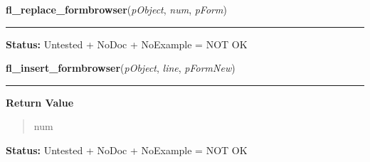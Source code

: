     \vspace{0.5ex}

\hspace{.8\funcindent}\begin{boxedminipage}{\funcwidth}

    \raggedright \textbf{fl\_replace\_formbrowser}(\textit{pObject}, \textit{num}, \textit{pForm})

    \vspace{-1.5ex}

    \rule{\textwidth}{0.5\fboxrule}
\setlength{\parskip}{2ex}
\setlength{\parskip}{1ex}
\textbf{Status:} Untested + NoDoc + NoExample = NOT OK



    \end{boxedminipage}

    \label{xformslib:library:fl_insert_formbrowser}

    \vspace{0.5ex}

\hspace{.8\funcindent}\begin{boxedminipage}{\funcwidth}

    \raggedright \textbf{fl\_insert\_formbrowser}(\textit{pObject}, \textit{line}, \textit{pFormNew})

    \vspace{-1.5ex}

    \rule{\textwidth}{0.5\fboxrule}
\setlength{\parskip}{2ex}
\setlength{\parskip}{1ex}
      \textbf{Return Value}
    \vspace{-1ex}

      \begin{quote}
      num

      \end{quote}

\textbf{Status:} Untested + NoDoc + NoExample = NOT OK



    \end{boxedminipage}

    \label{xformslib:library:fl_get_formbrowser_area}

    \vspace{0.5ex}

